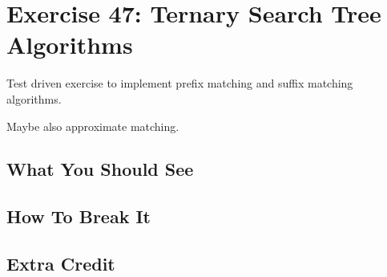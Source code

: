 \chapter{Exercise 47: Ternary Search Tree Algorithms}

Test driven exercise to implement prefix matching and suffix matching algorithms.

Maybe also approximate matching.

\section{What You Should See}


\section{How To Break It}


\section{Extra Credit}



